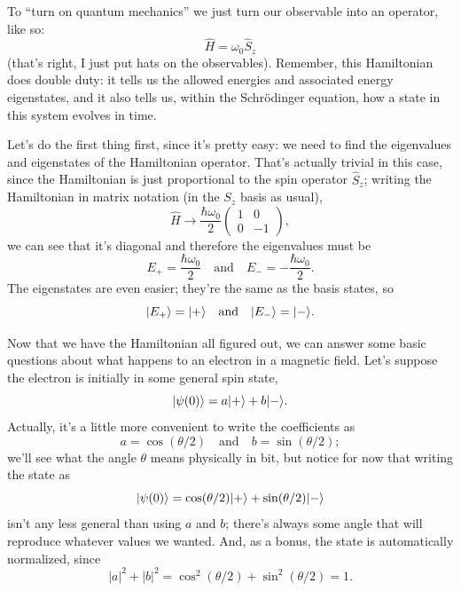 To ``turn on quantum mechanics'' we just turn our observable into an operator, like so:
\begin{equation}
\hat{H} = \omega_0 \hat{S}_z
\end{equation}
(that's right, I just put hats on the observables).  Remember, this Hamiltonian does double duty:  it tells us the allowed energies and associated energy eigenstates, and it also tells us, within the Schr\"odinger equation, how a state in this system evolves in time.  

Let's do the first thing first, since it's pretty easy: we need to find the eigenvalues and eigenstates of the Hamiltonian operator.  That's actually trivial in this case, since the Hamiltonian is just proportional to the spin operator $\hat{S}_z$; writing the Hamiltonian in matrix notation (in the $S_z$ basis as usual),
\[
\hat{H} \to \frac{\hbar \omega_0}{2} \begin{pmatrix} 1 & 0 \\ 0 & -1 \end{pmatrix},
\]
we can see that it's diagonal and therefore the eigenvalues must be
\begin{equation}
E_+ = \frac{\hbar \omega_0}{2} \quad \text{and} \quad E_- = -\frac{\hbar \omega_0}{2}.
\end{equation}
The eigenstates are even easier; they're the same as the basis states, so
\begin{equation}
| E_+ \rangle = | + \rangle \quad \text{and} \quad | E_- \rangle = | - \rangle.
\end{equation}

Now that we have the Hamiltonian all figured out, we can answer some basic questions about what happens to an electron in a magnetic field.  Let's suppose the electron is initially in some general spin state,
\[
| \psi(0) \rangle = a| + \rangle + b| - \rangle.
\]
Actually, it's a little more convenient to write the coefficients as
\[
a = \cos (\theta/2) \quad \text{and} \quad b = \sin (\theta/2);
\]
we'll see what the angle $\theta$ means physically in bit, but notice for now that writing the state as
\begin{equation}
| \psi(0) \rangle = \cos (\theta/2)| + \rangle + \sin (\theta/2)| - \rangle
\end{equation}
isn't any less general than using $a$ and $b$; there's always some angle that will reproduce whatever values we wanted.  And, as a bonus, the state is automatically normalized, since
\[
|a|^2 + |b|^2 = \cos^2(\theta/2) + \sin^2(\theta/2) = 1.
\]

